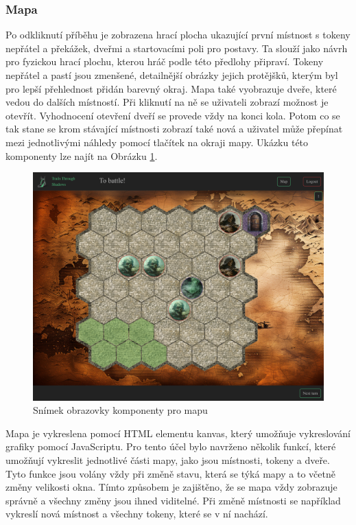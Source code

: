 \subsubsection*{Mapa}
Po odkliknutí příběhu je zobrazena hrací plocha ukazující první místnost s tokeny nepřátel a překážek, dveřmi a startovacími poli pro postavy. Ta slouží jako návrh pro fyzickou hrací plochu, kterou hráč podle této předlohy připraví. Tokeny nepřátel a pastí jsou zmenšené, detailnější obrázky jejich protějšků, kterým byl pro lepší přehlednost přidán barevný okraj. Mapa také vyobrazuje dveře, které vedou do dalších místností. Při kliknutí na ně se uživateli zobrazí možnost je otevřít. Vyhodnocení otevření dveří se provede vždy na konci kola. Potom co se tak stane se krom stávající místnosti zobrazí také nová a uživatel může přepínat mezi jednotlivými náhledy pomocí tlačítek na okraji mapy. Ukázku této komponenty lze najít na Obrázku \ref{fig:map}.

\begin{figure}[H]
  \centering
  \includegraphics[width=.95\textwidth]{resources/figures/TTS-Map.png}
  \caption{Snímek obrazovky komponenty pro mapu}
  \label{fig:map}
\end{figure}

Mapa je vykreslena pomocí HTML elementu kanvas, který umožňuje vykreslování grafiky pomocí JavaScriptu. Pro tento účel bylo navrženo několik funkcí, které umožňují vykreslit jednotlivé části mapy, jako jsou místnosti, tokeny a dveře. Tyto funkce jsou volány vždy při změně stavu, která se týká mapy a to včetně změny velikosti okna. Tímto způsobem je zajištěno, že se mapa vždy zobrazuje správně a všechny změny jsou ihned viditelné. Při změně místnosti se například vykreslí nová místnost a všechny tokeny, které se v ní nachází. 

